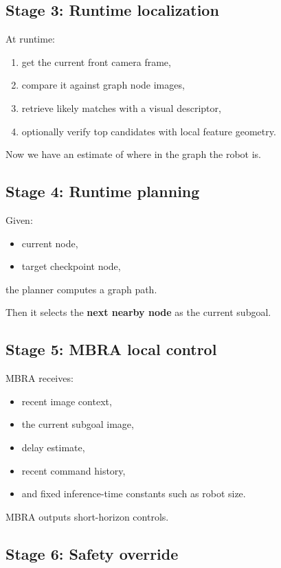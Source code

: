 \documentclass[11pt,a4paper]{article}
\begin{document}
\subsection{Stage 3: Runtime localization}

At runtime:
\begin{enumerate}[nosep]
  \item get the current front camera frame,
  \item compare it against graph node images,
  \item retrieve likely matches with a visual descriptor,
  \item optionally verify top candidates with local feature geometry.
\end{enumerate}

Now we have an estimate of where in the graph the robot is.

\subsection{Stage 4: Runtime planning}

Given:
\begin{itemize}[nosep]
  \item current node,
  \item target checkpoint node,
\end{itemize}
the planner computes a graph path.

Then it selects the \textbf{next nearby node} as the current subgoal.

\subsection{Stage 5: MBRA local control}

MBRA receives:
\begin{itemize}[nosep]
  \item recent image context,
  \item the current subgoal image,
  \item delay estimate,
  \item recent command history,
  \item and fixed inference-time constants such as robot size.
\end{itemize}

MBRA outputs short-horizon controls.

\subsection{Stage 6: Safety override}
\end{document}
